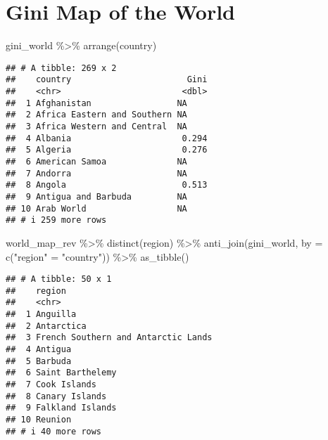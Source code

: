 \documentclass[
]{article}
\newenvironment{Shaded}{\begin{snugshade}}{\end{snugshade}}
\newcommand{\AttributeTok}[1]{\textcolor[rgb]{0.77,0.63,0.00}{#1}}
\newcommand{\FunctionTok}[1]{\textcolor[rgb]{0.00,0.00,0.00}{#1}}
\newcommand{\NormalTok}[1]{#1}
\newcommand{\OtherTok}[1]{\textcolor[rgb]{0.56,0.35,0.01}{#1}}
\newcommand{\SpecialCharTok}[1]{\textcolor[rgb]{0.00,0.00,0.00}{#1}}
\newcommand{\StringTok}[1]{\textcolor[rgb]{0.31,0.60,0.02}{#1}}
\begin{document}
\hypertarget{gini-map-of-the-world}{%
\section{Gini Map of the World}\label{gini-map-of-the-world}}

\begin{Shaded}
\begin{Highlighting}[]
\NormalTok{gini\_world }\SpecialCharTok{\%\textgreater{}\%} \FunctionTok{arrange}\NormalTok{(country)}
\end{Highlighting}
\end{Shaded}

\begin{verbatim}
## # A tibble: 269 x 2
##    country                       Gini
##    <chr>                        <dbl>
##  1 Afghanistan                 NA    
##  2 Africa Eastern and Southern NA    
##  3 Africa Western and Central  NA    
##  4 Albania                      0.294
##  5 Algeria                      0.276
##  6 American Samoa              NA    
##  7 Andorra                     NA    
##  8 Angola                       0.513
##  9 Antigua and Barbuda         NA    
## 10 Arab World                  NA    
## # i 259 more rows
\end{verbatim}

\begin{Shaded}
\begin{Highlighting}[]
\NormalTok{world\_map\_rev }\SpecialCharTok{\%\textgreater{}\%} \FunctionTok{distinct}\NormalTok{(region) }\SpecialCharTok{\%\textgreater{}\%} 
  \FunctionTok{anti\_join}\NormalTok{(gini\_world, }\AttributeTok{by =} \FunctionTok{c}\NormalTok{(}\StringTok{"region"} \OtherTok{=} \StringTok{"country"}\NormalTok{)) }\SpecialCharTok{\%\textgreater{}\%} \FunctionTok{as\_tibble}\NormalTok{()}
\end{Highlighting}
\end{Shaded}

\begin{verbatim}
## # A tibble: 50 x 1
##    region                             
##    <chr>                              
##  1 Anguilla                           
##  2 Antarctica                         
##  3 French Southern and Antarctic Lands
##  4 Antigua                            
##  5 Barbuda                            
##  6 Saint Barthelemy                   
##  7 Cook Islands                       
##  8 Canary Islands                     
##  9 Falkland Islands                   
## 10 Reunion                            
## # i 40 more rows
\end{verbatim}
\end{document}
